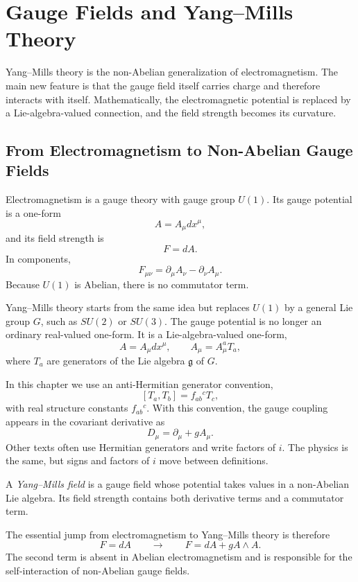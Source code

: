 \chapter{Gauge Fields and Yang--Mills Theory}

\begin{remarkbox}
Yang--Mills theory is the non-Abelian generalization of electromagnetism. The
main new feature is that the gauge field itself carries charge and therefore
interacts with itself. Mathematically, the electromagnetic potential is replaced
by a Lie-algebra-valued connection, and the field strength becomes its curvature.
\end{remarkbox}

\section{From Electromagnetism to Non-Abelian Gauge Fields}

Electromagnetism is a gauge theory with gauge group \(U(1)\). Its gauge
potential is a one-form
\[
    A=A_\mu dx^\mu,
\]
and its field strength is
\[
    F=dA.
\]
In components,
\[
    F_{\mu\nu}=\partial_\mu A_\nu-\partial_\nu A_\mu.
\]
Because \(U(1)\) is Abelian, there is no commutator term.

Yang--Mills theory starts from the same idea but replaces \(U(1)\) by a general
Lie group \(G\), such as \(SU(2)\) or \(SU(3)\). The gauge potential is no longer
an ordinary real-valued one-form. It is a Lie-algebra-valued one-form,
\[
    A=A_\mu dx^\mu,
    \qquad
    A_\mu=A_\mu^a T_a,
\]
where \(T_a\) are generators of the Lie algebra \(\mathfrak{g}\) of \(G\).

In this chapter we use an anti-Hermitian generator convention,
\[
    [T_a,T_b]=f_{ab}{}^c T_c,
\]
with real structure constants \(f_{ab}{}^c\). With this convention, the gauge
coupling appears in the covariant derivative as
\[
    D_\mu=\partial_\mu+gA_\mu.
\]
Other texts often use Hermitian generators and write factors of \(i\). The
physics is the same, but signs and factors of \(i\) move between definitions.

\begin{definitionbox}
A \emph{Yang--Mills field} is a gauge field whose potential takes values in a
non-Abelian Lie algebra. Its field strength contains both derivative terms and a
commutator term.
\end{definitionbox}

The essential jump from electromagnetism to Yang--Mills theory is therefore
\[
    F=dA
    \qquad\longrightarrow\qquad
    F=dA+gA\wedge A.
\]
The second term is absent in Abelian electromagnetism and is responsible for the
self-interaction of non-Abelian gauge fields.

